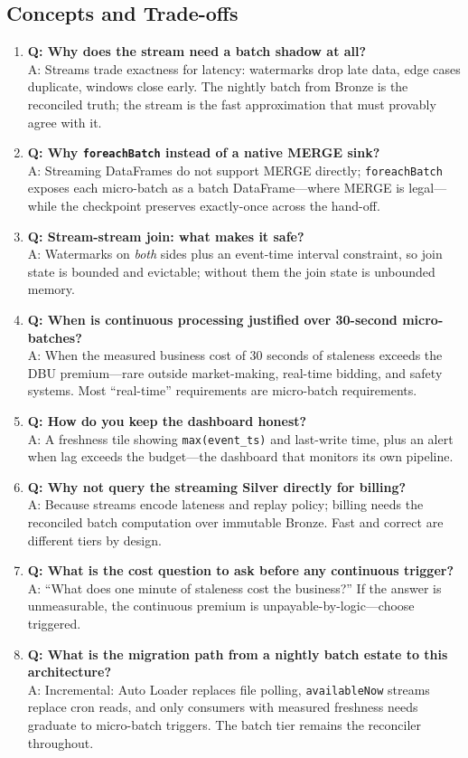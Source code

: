 \subsection{Concepts and Trade-offs}
\begin{enumerate}
    \item \textbf{Q: Why does the stream need a batch shadow at all?}\\
    A: Streams trade exactness for latency: watermarks drop late data, edge cases duplicate, windows close early. The nightly batch from Bronze is the reconciled truth; the stream is the fast approximation that must provably agree with it.
    \item \textbf{Q: Why \texttt{foreachBatch} instead of a native MERGE sink?}\\
    A: Streaming DataFrames do not support MERGE directly; \texttt{foreachBatch} exposes each micro-batch as a batch DataFrame---where MERGE is legal---while the checkpoint preserves exactly-once across the hand-off.
    \item \textbf{Q: Stream-stream join: what makes it safe?}\\
    A: Watermarks on \emph{both} sides plus an event-time interval constraint, so join state is bounded and evictable; without them the join state is unbounded memory.
    \item \textbf{Q: When is continuous processing justified over 30-second micro-batches?}\\
    A: When the measured business cost of 30 seconds of staleness exceeds the DBU premium---rare outside market-making, real-time bidding, and safety systems. Most ``real-time'' requirements are micro-batch requirements.
    \item \textbf{Q: How do you keep the dashboard honest?}\\
    A: A freshness tile showing \texttt{max(event\_ts)} and last-write time, plus an alert when lag exceeds the budget---the dashboard that monitors its own pipeline.
    \item \textbf{Q: Why not query the streaming Silver directly for billing?}\\
    A: Because streams encode lateness and replay policy; billing needs the reconciled batch computation over immutable Bronze. Fast and correct are different tiers by design.
    \item \textbf{Q: What is the cost question to ask before any continuous trigger?}\\
    A: ``What does one minute of staleness cost the business?'' If the answer is unmeasurable, the continuous premium is unpayable-by-logic---choose triggered.
    \item \textbf{Q: What is the migration path from a nightly batch estate to this architecture?}\\
    A: Incremental: Auto Loader replaces file polling, \texttt{availableNow} streams replace cron reads, and only consumers with measured freshness needs graduate to micro-batch triggers. The batch tier remains the reconciler throughout.
\end{enumerate}

